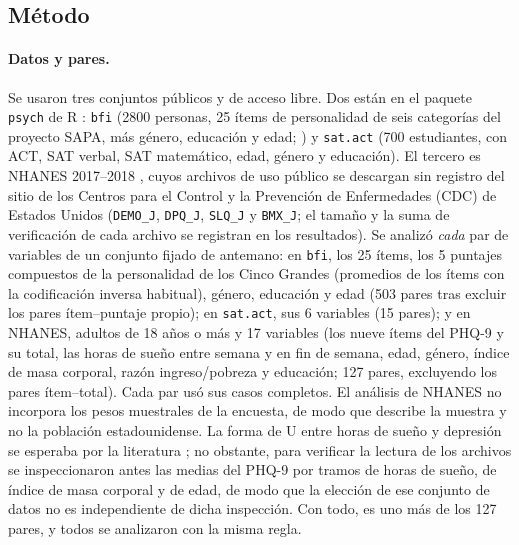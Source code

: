 \documentclass[man,donotrepeattitle,floatsintext]{apa7}
\begin{document}
\subsection{Método}

\paragraph{Datos y pares.} Se usaron tres conjuntos públicos y de acceso libre. Dos están en el paquete \texttt{psych} de R \parencite{revelle2024psych}: \texttt{bfi} (2800 personas, 25 ítems de personalidad de seis categorías del proyecto SAPA, más género, educación y edad; \cite{revelle2010sapa}) y \texttt{sat.act} (700 estudiantes, con ACT, SAT verbal, SAT matemático, edad, género y educación). El tercero es NHANES 2017--2018 \parencite{nhanes2017}, cuyos archivos de uso público se descargan sin registro del sitio de los Centros para el Control y la Prevención de Enfermedades (CDC) de Estados Unidos (\texttt{DEMO\_J}, \texttt{DPQ\_J}, \texttt{SLQ\_J} y \texttt{BMX\_J}; el tamaño y la suma de verificación de cada archivo se registran en los resultados). Se analizó \emph{cada} par de variables de un conjunto fijado de antemano: en \texttt{bfi}, los 25 ítems, los 5 puntajes compuestos de la personalidad de los Cinco Grandes (promedios de los ítems con la codificación inversa habitual), género, educación y edad (503 pares tras excluir los pares ítem--puntaje propio); en \texttt{sat.act}, sus 6 variables (15 pares); y en NHANES, adultos de 18 años o más y 17 variables (los nueve ítems del PHQ-9 \parencite{kroenke2001} y su total, las horas de sueño entre semana y en fin de semana, edad, género, índice de masa corporal, razón ingreso/pobreza y educación; 127 pares, excluyendo los pares ítem--total). Cada par usó sus casos completos. El análisis de NHANES no incorpora los pesos muestrales de la encuesta, de modo que describe la muestra y no la población estadounidense. La forma de U entre horas de sueño y depresión se esperaba por la literatura \parencite{zhai2015}; no obstante, para verificar la lectura de los archivos se inspeccionaron antes las medias del PHQ-9 por tramos de horas de sueño, de índice de masa corporal y de edad, de modo que la elección de ese conjunto de datos no es independiente de dicha inspección. Con todo, es uno más de los 127 pares, y todos se analizaron con la misma regla.
\end{document}
